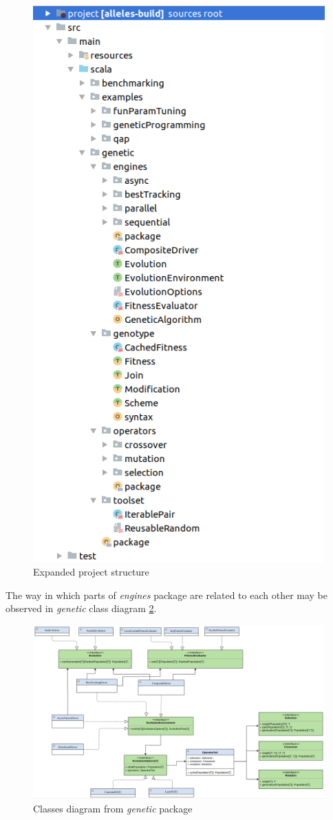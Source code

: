 \begin{figure}
\includegraphics[width=.7\textwidth]{img/diagrams/alleles-project-structure}
\caption{Expanded project structure}\label{diag:project-structure}
\end{figure}

\medbreak
The way in which parts of \textit{engines} package are related to each other may be observed in \textit{genetic} class diagram \ref{diag:genetic-classes}.

\begin{figure}
\centering\includegraphics[width=1.\textwidth]{img/diagrams/alleles-genetic-class}
\caption{Classes diagram from \textit{genetic} package}\label{diag:genetic-classes}
\end{figure}